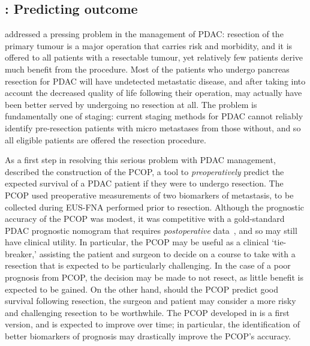 \documentclass[thesis.tex]{subfiles}
\begin{document}
\subsection{\texorpdfstring{}{Chapter 3}: Predicting outcome}
 addressed a pressing problem in the management of \gls{PDAC}: resection of the primary tumour is a major operation that carries risk and morbidity, and it is offered to all patients with a resectable tumour, yet relatively few patients derive much benefit from the procedure.  Most of the patients who undergo pancreas resection for \gls{PDAC} will have undetected metastatic disease, and after taking into account the decreased quality of life following their operation, may actually have been better served by undergoing no resection at all.  The problem is fundamentally one of staging: current staging methods for \gls{PDAC} cannot reliably identify pre-resection patients with micro metastases from those without, and so all eligible patients are offered the resection procedure.

As a first step in resolving this serious problem with \gls{PDAC} management,  described the construction of the \gls{PCOP}, a tool to \emph{preoperatively} predict the expected survival of a \gls{PDAC} patient if they were to undergo resection.  The \gls{PCOP} used preoperative measurements of two biomarkers of metastasis, to be collected during \gls{EUS}-\gls{FNA} performed prior to resection.  Although the prognostic accuracy of the \gls{PCOP} was modest, it was competitive with a gold-standard \gls{PDAC} prognostic nomogram that requires \emph{postoperative} data~\cite{Brennan2004}, and so may still have clinical utility.  In particular, the \gls{PCOP} may be useful as a clinical `tie-breaker,' assisting the patient and surgeon to decide on a course to take with a resection that is expected to be particularly challenging.  In the case of a poor prognosis from \gls{PCOP}, the decision may be made to not resect, as little benefit is expected to be gained.  On the other hand, should the \gls{PCOP} predict good survival following resection, the surgeon and patient may consider a more risky and challenging resection to be worthwhile.  The \gls{PCOP} developed in  is a first version, and is expected to improve over time; in particular, the identification of better biomarkers of prognosis may drastically improve the \gls{PCOP}'s accuracy.
  
\end{document}
